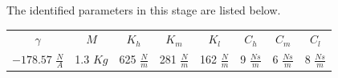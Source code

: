 The identified parameters in this stage are listed below.
\begin{table}[!h]
\centering
\begin{tabular}{|c|c|c|c|c|c|c|c|}
	$\gamma$ & $M$ & $K_h$ & $K_m$ & $K_l$ & $C_h$ & $C_m$ & $C_l$ \\
	$-178.57$ $\frac{N}{A}$ & 1.3 $Kg$ & 625 $\frac{N}{m}$ & 281 $\frac{N}{m}$ & 162 $\frac{N}{m}$ & 9 $\frac{Ns}{m}$ & 6 $\frac{Ns}{m}$ & 8 $\frac{Ns}{m}$\\
\end{tabular}
\end{table}